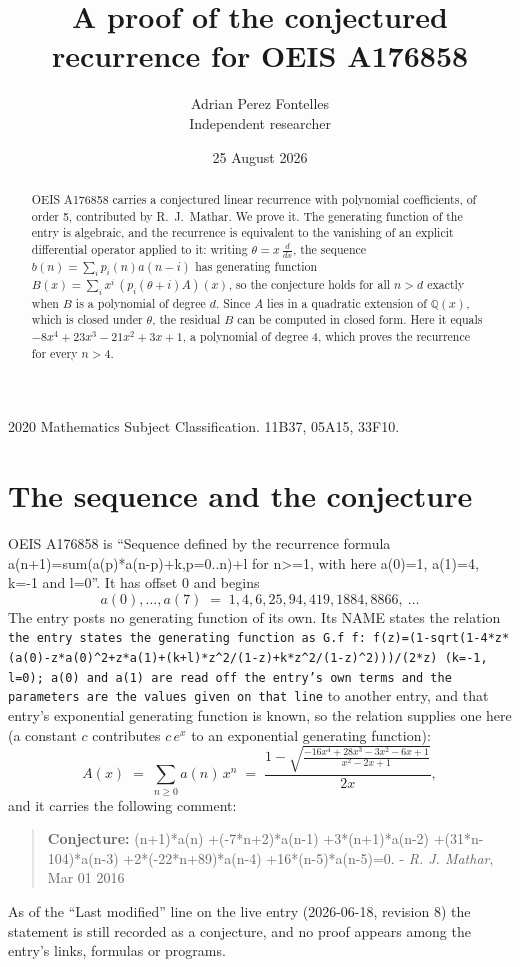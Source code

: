 \documentclass[11pt,a4paper]{article}
\title{A proof of the conjectured recurrence for OEIS A176858}
\author{Adrian Perez Fontelles\\ \small Independent researcher}
\date{25 August 2026}
\theoremstyle{plain}
\theoremstyle{definition}
\begin{document}
\maketitle

\begin{abstract}
OEIS A176858 carries a conjectured linear recurrence with polynomial coefficients, of
order 5, contributed by R.~J.~Mathar. We prove it. The generating function of the
entry is algebraic, and the recurrence is equivalent to the vanishing of an explicit
differential operator applied to it: writing $\theta=x\,\frac{d}{dx}$, the sequence
$b(n)=\sum_{i}p_{i}(n)a(n-i)$ has generating function
$B(x)=\sum_{i}x^{i}\,(p_{i}(\theta+i)A)(x)$, so the conjecture holds for all $n>d$ exactly
when $B$ is a polynomial of degree $d$. Since $A$ lies in a quadratic extension of
$\mathbb{Q}(x)$, which is closed under $\theta$, the residual $B$ can be computed in
closed form. Here it equals $- 8 x^{4} + 23 x^{3} - 21 x^{2} + 3 x + 1$, a polynomial of degree $4$, which proves
the recurrence for every $n>4$.
\end{abstract}

\noindent\small 2020 Mathematics Subject Classification. 11B37, 05A15, 33F10.\normalsize

\section{The sequence and the conjecture}

OEIS A176858 is ``Sequence defined by the recurrence formula a(n+1)=sum(a(p)*a(n-p)+k,p=0..n)+l for n>=1, with here a(0)=1, a(1)=4, k=-1 and l=0''. It has offset $0$ and begins
\[
a(0),\dots,a(7)\;=\;1, 4, 6, 25, 94, 419, 1884, 8866,\ \dots
\]
The entry posts no generating function of its own. Its NAME states the
relation \texttt{the entry states the generating function as G.f f: f(z)=(1-sqrt(1-4*z*(a(0)-z*a(0)\textasciicircum{}2+z*a(1)+(k+l)*z\textasciicircum{}2/(1-z)+k*z\textasciicircum{}2/(1-z)\textasciicircum{}2)))/(2*z) (k=-1, l=0); a(0) and a(1) are read off the entry's own terms and the parameters are the values given on that line} to another entry, and that entry's exponential generating
function is known, so the relation supplies one here (a constant $c$ contributes
$c\,e^{x}$ to an exponential generating function):
\begin{equation}\label{eq:gf}
A(x)\;=\;\sum_{n\ge 0} a(n)\,x^{n}\;=\;\frac{1 - \sqrt{\frac{- 16 x^{4} + 28 x^{3} - 3 x^{2} - 6 x + 1}{x^{2} - 2 x + 1}}}{2 x} ,
\end{equation}
and it carries the following comment:
\begin{quote}\small
\textbf{Conjecture:} (n+1)*a(n) +(-7*n+2)*a(n-1) +3*(n+1)*a(n-2) +(31*n-104)*a(n-3) +2*(-22*n+89)*a(n-4) +16*(n-5)*a(n-5)=0. - \emph{R. J. Mathar}, Mar 01 2016
\end{quote}
As of the ``Last modified'' line on the live entry (2026-06-18, revision 8) the
statement is still recorded as a conjecture, and no proof appears among the entry's links,
formulas or programs.
\end{document}
